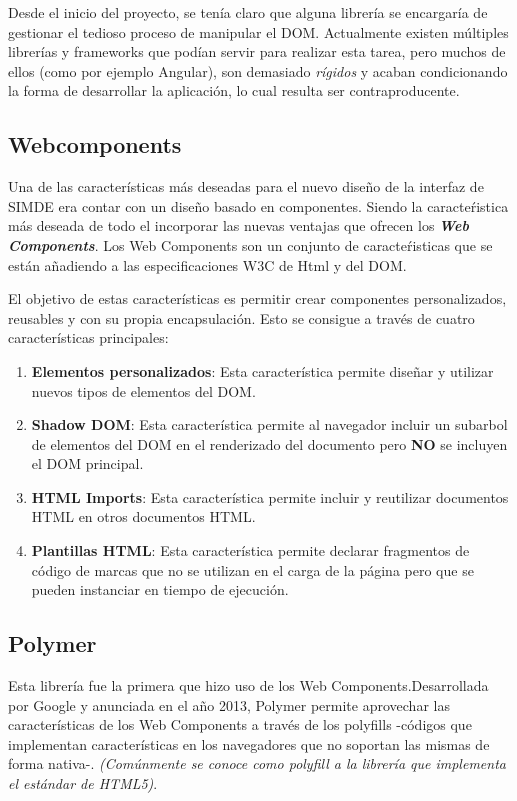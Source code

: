 Desde el inicio del proyecto, se tenía claro que alguna librería se encargaría de gestionar
 el tedioso proceso de manipular el DOM. Actualmente existen múltiples librerías 
y frameworks que podían servir para realizar esta tarea, pero muchos de ellos (como por ejemplo Angular),
son demasiado \textit{rígidos} y acaban condicionando la forma de desarrollar la aplicación, 
lo cual resulta ser contraproducente.

\subsection{Webcomponents}

\bigskip
Una de las características más deseadas para el nuevo diseño de la interfaz de SIMDE era contar con
un diseño basado en componentes. Siendo la caracteŕistica más deseada de todo el incorporar las nuevas 
ventajas que ofrecen los \textit\textbf{Web Components}. Los Web Components son un conjunto de 
caracteŕisticas que se están añadiendo a las especificaciones W3C de Html y del DOM. \cite{Webcomponents}

\bigskip 
El objetivo de estas características es permitir crear componentes personalizados, reusables y 
con su propia encapsulación. Esto se consigue a través de cuatro características principales:

\begin{enumerate}

\item \textbf{Elementos personalizados}: Esta característica permite diseñar y utilizar nuevos tipos 
de elementos del DOM.
\item \textbf{Shadow DOM}: Esta característica permite al navegador incluir un subarbol de elementos del 
DOM en el renderizado del documento pero \textbf{NO} se incluyen el DOM principal.
\item \textbf{HTML Imports}: Esta característica permite incluir y reutilizar documentos HTML en otros 
documentos HTML.
\item \textbf{Plantillas HTML}: Esta característica permite declarar fragmentos de código de marcas que no
se utilizan en el carga de la página pero que se pueden instanciar en tiempo de ejecución. 

\end{enumerate}

\subsection{Polymer}
Esta librería fue la primera que hizo uso de los Web Components.Desarrollada por Google y anunciada en 
el año 2013, Polymer permite aprovechar las características de los Web Components \cite{Polymer} a través de los polyfills 
-códigos que implementan características en los navegadores que no soportan las mismas de forma nativa-.
\textit{(Comúnmente se conoce como polyfill a la librería que implementa el estándar de HTML5)}. \cite{Polyfill} 

